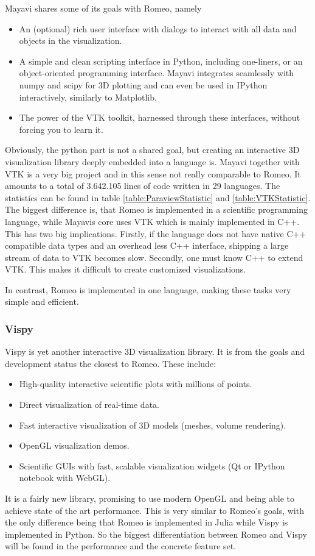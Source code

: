 Mayavi shares some of its goals with Romeo, namely\cite{MayaviGoals}
\begin{itemize}
	\item An (optional) rich user interface with dialogs to interact with all data and objects in the visualization.
	\item A simple and clean scripting interface in Python, including one-liners, or an object-oriented programming interface. Mayavi integrates seamlessly with numpy and scipy for 3D plotting and can even be used in IPython interactively, similarly to Matplotlib.
	\item The power of the VTK toolkit, harnessed through these interfaces, without forcing you to learn it.
\end{itemize}
Obviously, the python part is not a shared goal, but creating an interactive 3D visualization library deeply embedded into a language is.
Mayavi together with VTK is a very big project and in this sense not really comparable to Romeo.
It amounts to a total of 3.642.105 lines of code written in 29 languages. The statistics can be found in table \ref{table:ParaviewStatistic} and \ref{table:VTKStatistic}.
The biggest difference is, that Romeo is implemented in a scientific programming language, while Mayavis core uses VTK which is mainly implemented in C++.
This has two big implications.
Firstly, if the language does not have native C++ compatible data types and an overhead less C++ interface, shipping a large stream of data to VTK becomes slow.
Secondly, one must know C++ to extend VTK. This makes it difficult to create customized visualizations.

In contrast, Romeo is implemented in one language, making these tasks very simple and efficient.


\subsubsection{Vispy}

Vispy is yet another interactive 3D visualization library. It is from the goals and development status the closest to Romeo.
These include\cite{VispyGoals}:

\begin{itemize}
	\item High-quality interactive scientific plots with millions of points.
	\item Direct visualization of real-time data.
	\item Fast interactive visualization of 3D models (meshes, volume rendering).
	\item OpenGL visualization demos.
	\item Scientific GUIs with fast, scalable visualization widgets (Qt or IPython notebook with WebGL).
\end{itemize}

It is a fairly new library, promising to use modern OpenGL and being able to achieve state of the art performance.
This is very similar to Romeo's goals, with the only difference being that Romeo is implemented in Julia while Vispy is implemented in Python.
So the biggest differentiation between Romeo and Vispy will be found in the performance and the concrete feature set.


